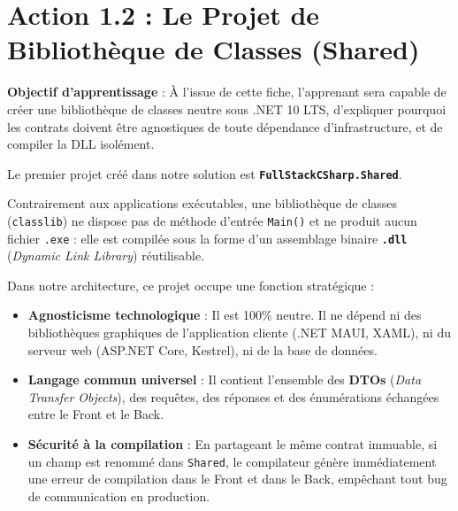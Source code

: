 \section{Action 1.2 : Le Projet de Bibliothèque de Classes (Shared)}

\begin{tcolorbox}[colback=indigo!4!white,colframe=indigo!40!white,arc=2mm,boxrule=0.8pt,top=2mm,bottom=2mm,left=3mm,right=3mm]
    \small\textbf{\color{indigo!90!black}Objectif d'apprentissage} : À l'issue de cette fiche, l'apprenant sera capable de créer une bibliothèque de classes neutre sous .NET 10 LTS, d'expliquer pourquoi les contrats doivent être agnostiques de toute dépendance d'infrastructure, et de compiler la DLL isolément.
\end{tcolorbox}

\vspace{0.1cm}

Le premier projet créé dans notre solution est \textbf{\texttt{FullStackCSharp.Shared}}. 

Contrairement aux applications exécutables, une bibliothèque de classes (\texttt{classlib}) ne dispose pas de méthode d'entrée \texttt{Main()} et ne produit aucun fichier \texttt{.exe} : elle est compilée sous la forme d'un assemblage binaire \textbf{\texttt{.dll}} (\textit{Dynamic Link Library}) réutilisable.

Dans notre architecture, ce projet occupe une fonction stratégique :
\begin{itemize}
    \item \textbf{Agnosticisme technologique} : Il est 100\% neutre. Il ne dépend ni des bibliothèques graphiques de l'application cliente (.NET MAUI, XAML), ni du serveur web (ASP.NET Core, Kestrel), ni de la base de données.
    \item \textbf{Langage commun universel} : Il contient l'ensemble des \textbf{DTOs} (\textit{Data Transfer Objects}), des requêtes, des réponses et des énumérations échangées entre le Front et le Back.
    \item \textbf{Sécurité à la compilation} : En partageant le même contrat immuable, si un champ est renommé dans \texttt{Shared}, le compilateur génère immédiatement une erreur de compilation dans le Front et dans le Back, empêchant tout bug de communication en production.
\end{itemize}

\vspace{0.3cm}

